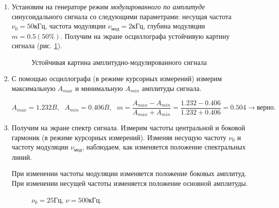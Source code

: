 \documentclass[a4paper,12pt]{article} %
\begin{document}
\begin{enumerate}
    \item Установим на генераторе режим \textit{модулированного по амплитуде} синусоидального сигнала со следующими параметрами: несущая частота $\nu_0 = 50 \text{кГц}$, частота модуляции $\nu_{\text{мод}} = 2 \text{кГц}$, глубина модуляции $m = 0.5 (50 \%)$. Получим на экране осциллографа устойчивую картину сигнала (рис. \ref{f16}).

    \begin{figure}[h]
        \caption{Устойчивая картина амплитудно-модулированного сигнала}
        \label{f16}
    \end{figure}

    \item С помощью осциллографа (в режиме курсорных измерений) измерим максимальную $A_{max}$ и минимальную $A_{min}$ амплитуды сигнала.

    \[ A_{max} = 1.232 B, \text{ } A_{min} = 0.406 B, \text{ } m = \frac{A_{max} - A_{min}}{A_{max} + A_{min}} = \frac{1.232 - 0.406}{1.232 + 0.406} = 0.504 \rightarrow \textit{верно.} \]

    \item Получим на экране спектр сигнала. Измерим частоты центральной и боковой гармоник (в режиме курсорных измерений). Изменяя несущую частоту $\nu_0$ и частоту модуляции $\nu_{\text{мод}}$, наблюдаем, как изменяется положение спектральных линий.

    При изменении частоты модуляции изменяется положение боковых амплитуд. При изменении несущей частоты изменяется положение основной амплитуды.

    \begin{figure}[h]
        \begin{minipage}[h]{0.5\linewidth}
            \caption{$\nu_0 = 25 \text{Гц}$, $\nu = 1 \text{кГц}$.}
        \end{minipage}
        \begin{minipage}[h]{0.5\linewidth}
            \caption{$\nu_0 = 25 \text{Гц}$, $\nu = 1.5 \text{кГц}$.}
        \end{minipage}
        \begin{minipage}[h]{0.5\linewidth}
            \caption{$\nu_0 = 25 \text{Гц}$, $\nu = 500 \text{кГц}$.}
        \end{minipage}
    \end{figure}


\end{enumerate}
\end{document}
